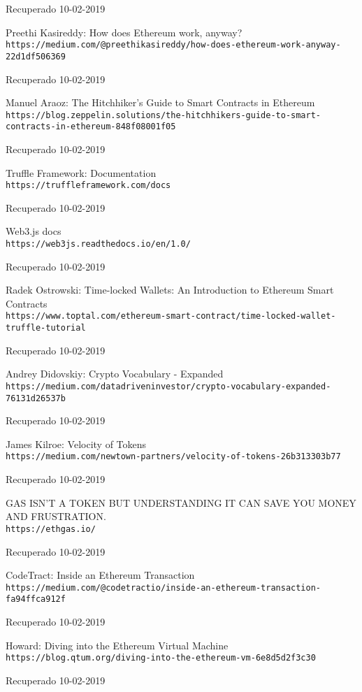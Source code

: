 \documentclass[a4paper,12pt,times,print,index]{Classes/PhDThesisPSnPDF}
\begin{document}
\begin{thebibliography}{40}
		Recuperado 10-02-2019
	
		Preethi Kasireddy: How does Ethereum work, anyway?	
		\\\texttt{https://medium.com/@preethikasireddy/how-does-ethereum-work-anyway-22d1df506369}
		
		Recuperado 10-02-2019
	
		Manuel Araoz: The Hitchhiker’s Guide to Smart Contracts in Ethereum
		\\\texttt{https://blog.zeppelin.solutions/the-hitchhikers-guide-to-smart-contracts-in-ethereum-848f08001f05}
		
		Recuperado 10-02-2019
	
		Truffle Framework: Documentation
		\\\texttt{https://truffleframework.com/docs}
		
		Recuperado 10-02-2019
		
		Web3.js docs
		\\\texttt{https://web3js.readthedocs.io/en/1.0/}
		
		Recuperado 10-02-2019
		
		Radek Ostrowski: Time-locked Wallets: An Introduction to Ethereum Smart Contracts
		\\\texttt{https://www.toptal.com/ethereum-smart-contract/time-locked-wallet-truffle-tutorial}
		
		Recuperado 10-02-2019
		
		Andrey Didovskiy: Crypto Vocabulary - Expanded
		\\\texttt{https://medium.com/datadriveninvestor/crypto-vocabulary-expanded-76131d26537b}
		
		Recuperado 10-02-2019
	
		James Kilroe: Velocity of Tokens
		\\\texttt{https://medium.com/newtown-partners/velocity-of-tokens-26b313303b77}
	
		Recuperado 10-02-2019
				
		GAS ISN’T A TOKEN BUT UNDERSTANDING IT CAN SAVE YOU MONEY AND FRUSTRATION.
		\\\texttt{https://ethgas.io/}
		
		Recuperado 10-02-2019
		
		CodeTract: Inside an Ethereum Transaction
		\\\texttt{https://medium.com/@codetractio/inside-an-ethereum-transaction-fa94ffca912f}
		
		Recuperado 10-02-2019
		
		Howard: Diving into the Ethereum Virtual Machine
		\\\texttt{https://blog.qtum.org/diving-into-the-ethereum-vm-6e8d5d2f3c30}
		
		Recuperado 10-02-2019
			
\end{thebibliography}
\end{document}
